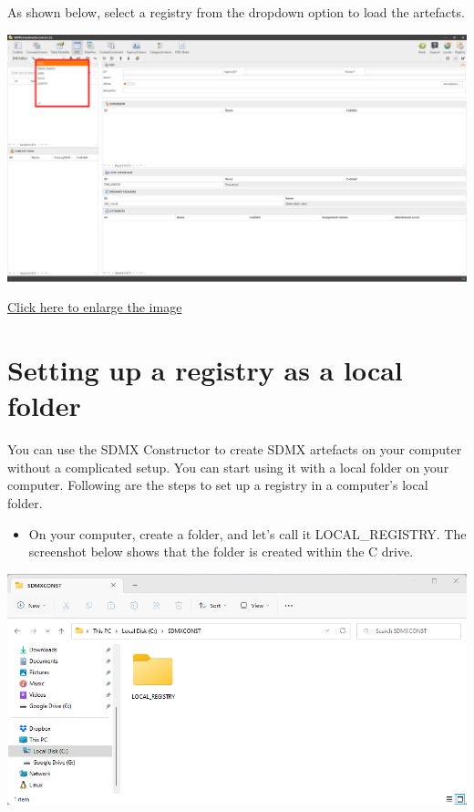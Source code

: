 \documentclass[
]{book}
\providecommand{\tightlist}{%
  \setlength{\itemsep}{0pt}\setlength{\parskip}{0pt}}
\begin{document}
As shown below, select a registry from the dropdown option to load the artefacts.

\begin{center}\includegraphics[width=1\linewidth]{./images/image046} \end{center}

\href{images/image046.png}{Click here to enlarge the image}

\hypertarget{setting-up}{%
\section{Setting up a registry as a local folder}\label{setting-up}}

You can use the SDMX Constructor to create SDMX artefacts on your computer without a complicated setup. You can start using it with a local folder on your computer. Following are the steps to set up a registry in a computer's local folder.

\begin{itemize}
\tightlist
\item
  On your computer, create a folder, and let's call it LOCAL\_REGISTRY. The screenshot below shows that the folder is created within the C drive.
\end{itemize}

\begin{center}\includegraphics[width=1\linewidth]{./images/image048} \end{center}
\end{document}
